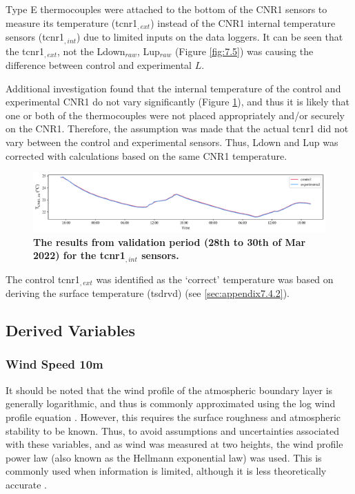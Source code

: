 \documentclass[final,3p,times,authoryear]{elsarticle}
\begin{document}
Type E thermocouples were attached to the bottom of the CNR1 sensors to measure its temperature (\gls{tcnr1}$_{,ext}$) instead of the CNR1 internal temperature sensors (\gls{tcnr1}$_{,int}$) due to limited inputs on the data loggers. It can be seen that the \gls{tcnr1}$_{,ext}$, not the \gls{Ldown}$_{raw}$, \gls{Lup}$_{raw}$ (Figure \ref{fig:7.5}) was causing the difference between control and experimental $L$. 

Additional investigation found that the internal temperature of the control and experimental CNR1 do not vary significantly (Figure \ref{fig:7.6}), and thus it is likely that one or both of the thermocouples were not placed appropriately and/or securely on the CNR1. Therefore, the assumption was made that the actual \gls{tcnr1} did not vary between the control and experimental sensors. Thus, \gls{Ldown} and \gls{Lup} was corrected with calculations based on the same CNR1 temperature.

\begin{figure}
\centering
\includegraphics[trim={0 0 0 0},clip,scale=1.0]{pict022.png}
\caption{\bf The results from validation period (28th to 30th of Mar 2022) for the \gls{tcnr1}$_{,int}$ sensors.}
 \label{fig:7.6}
\end{figure}


The control \gls{tcnr1}$_{,ext}$ was identified as the `correct' temperature was based on deriving the surface temperature (\gls{tsdrvd}) (see \ref{sec:appendix7.4.2}).



\subsection{Derived Variables}\label{sec:appendix7.4}
\subsubsection{Wind Speed 10m}\label{sec:appendix7.4.1}

It should be noted that the wind profile of the atmospheric boundary layer is generally logarithmic, and thus is commonly approximated using the log wind profile equation \citep{Banuelos-Ruedas2010}. However, this requires the surface roughness and atmospheric stability to be known. Thus, to avoid assumptions and uncertainties associated with these variables, and as wind was measured at two heights, the wind profile power law (also known as the Hellmann exponential law) was used. This is commonly used when information is limited, although it is less theoretically accurate \citep{Banuelos-Ruedas2010}.
\end{document}

